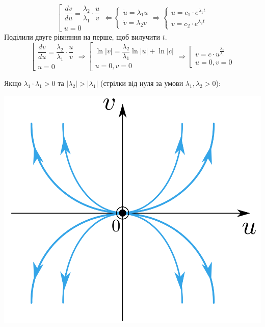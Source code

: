 $$
\left[ \begin{array}{l}
    \dfrac{dv}{du} = \dfrac{\lambda_2}{\lambda_1} \cdot \dfrac{u}{v}\\
    u = 0
\end{array} \right.
\Longleftarrow
\begin{cases}
    \dot{u} = \lambda_1 u \\
    \dot{v} = \lambda_2 v
\end{cases} \Longrightarrow
\begin{cases}
    u = c_1 \cdot e^{\lambda_1 t}\\
    v = c_2 \cdot e^{\lambda_2 t}
\end{cases}
$$
Поділили двуге рівняння на перше, щоб вилучити $t$.
$$
\left[ \begin{array}{l}
    \dfrac{dv}{du} = \dfrac{\lambda_2}{\lambda_1} \cdot \dfrac{u}{v}\\
    u = 0
\end{array} \right. \Longrightarrow \left[ \begin{array}{l}
    \ln{ \left| v \right| } = \dfrac{\lambda_2}{\lambda_1} \ln{ \left| u \right| } + \ln{ \left| c \right| } \\
    u = 0, v = 0
\end{array} \right. \Longrightarrow
\left[ \begin{array}{l}
    v = c  \cdot u^{ \frac{\lambda_2}{\lambda_1} }\\
    u = 0, v = 0
\end{array} \right.
$$

Якщо $ \lambda_1 \cdot \lambda_1 > 0 $ та $ \left| \lambda_2 \right| > \left| \lambda_1 \right|  $ (стрілки від нуля за умови $
 \lambda_1, \lambda_2 > 0$):

\begin{center} \includegraphics[scale=0.3]{assets/lectures_recent-b13d607a.png} \end{center}

